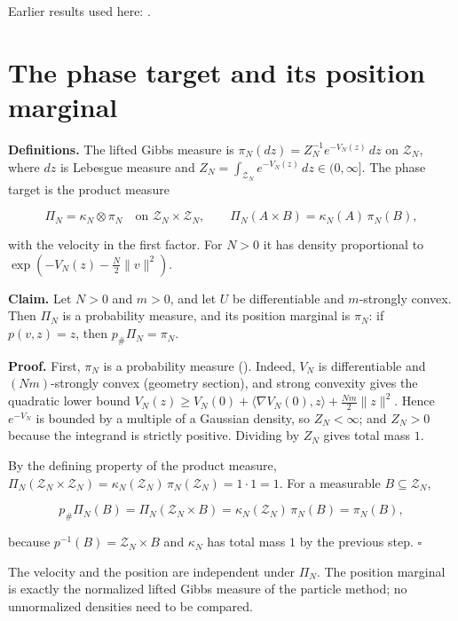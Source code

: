 \documentclass[11pt,a4paper]{article}
\begin{document}
Earlier results used here: \cite[Section~3.1.1]{LangevinLean2026IPLA}.

\section{\texorpdfstring{The phase target and its position marginal}{The phase target and its position marginal}}


\textbf{Definitions.} The lifted Gibbs measure is \(\pi_N(dz)=Z_N^{-1}e^{-V_N(z)}\,dz\) on \(\mathcal Z_N\), where \(dz\) is Lebesgue measure and \(Z_N=\int_{\mathcal Z_N}e^{-V_N(z)}\,dz\in(0,\infty]\). The phase target is the product measure


\[\Pi_N=\kappa_N\otimes\pi_N\quad\text{on }\mathcal Z_N\times\mathcal Z_N,\qquad\Pi_N(A\times B)=\kappa_N(A)\,\pi_N(B),\]


with the velocity in the first factor. For \(N>0\) it has density proportional to \(\exp(-V_N(z)-\frac N2\|v\|^2)\).




\textbf{Claim.} Let \(N>0\) and \(m>0\), and let \(U\) be differentiable and \(m\)-strongly convex. Then \(\Pi_N\) is a probability measure, and its position marginal is \(\pi_N\): if \(p(v,z)=z\), then \(p_\#\Pi_N=\pi_N\).




\textbf{Proof.} First, \(\pi_N\) is a probability measure (\cite[Section~3.5.1]{LangevinLean2026IPLA}). Indeed, \(V_N\) is differentiable and \((Nm)\)-strongly convex (geometry section), and strong convexity gives the quadratic lower bound \(V_N(z)\ge V_N(0)+\langle\nabla V_N(0),z\rangle+\frac{Nm}2\|z\|^2\). Hence \(e^{-V_N}\) is bounded by a multiple of a Gaussian density, so \(Z_N<\infty\); and \(Z_N>0\) because the integrand is strictly positive. Dividing by \(Z_N\) gives total mass \(1\).




By the defining property of the product measure, \(\Pi_N(\mathcal Z_N\times\mathcal Z_N)=\kappa_N(\mathcal Z_N)\,\pi_N(\mathcal Z_N)=1\cdot1=1\). For a measurable \(B\subseteq\mathcal Z_N\),


\[p_\#\Pi_N(B)=\Pi_N(\mathcal Z_N\times B)=\kappa_N(\mathcal Z_N)\,\pi_N(B)=\pi_N(B),\]


because \(p^{-1}(B)=\mathcal Z_N\times B\) and \(\kappa_N\) has total mass \(1\) by the previous step. \(\square\)




The velocity and the position are independent under \(\Pi_N\). The position marginal is exactly the normalized lifted Gibbs measure of the particle method; no unnormalized densities need to be compared.
\end{document}
